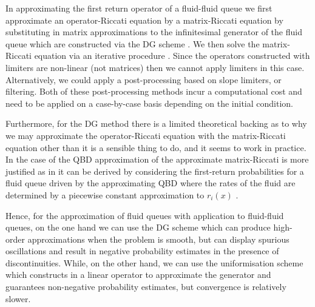 
In approximating the first return operator of a fluid-fluid queue we first approximate an operator-Riccati equation by a matrix-Riccati equation by substituting in matrix approximations to the infinitesimal generator of the fluid queue which are constructed via the DG scheme \citep{blnos2022}. We then solve the matrix-Riccati equation via an iterative procedure \citep{bean2005b,blnos2022}. Since the operators constructed with limiters are non-linear (not matrices) then we cannot apply limiters in this case. Alternatively, we could apply a post-processing based on slope limiters, or filtering. Both of these post-processing methods incur a computational cost and need to be applied on a case-by-case basis depending on the initial condition. 

Furthermore, for the DG method there is a limited theoretical backing as to why we may approximate the operator-Riccati equation with the matrix-Riccati equation other than it is a sensible thing to do, and it seems to work in practice. In the case of the QBD approximation of \cite{bo2013} the approximate matrix-Riccati is more justified as in it can be derived by considering the first-return probabilities for a fluid queue driven by the approximating QBD where the rates of the fluid are determined by a piecewise constant approximation to \(r_i(x)\) \citep{bean2005}. 

Hence, for the approximation of fluid queues with application to fluid-fluid queues, on the one hand we can use the DG scheme which can produce high-order approximations when the problem is smooth, but can display spurious oscillations and result in negative probability estimates in the presence of discontinuities. While, on the other hand, we can use the uniformisation scheme which constructs in a linear operator to approximate the generator and guarantees non-negative probability estimates, but convergence is relatively slower. 

